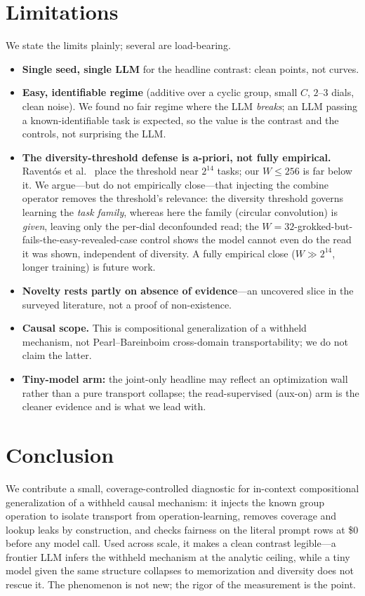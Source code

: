 \documentclass[11pt]{article}
\begin{document}
\section{Limitations}\label{sec:limits}
We state the limits plainly; several are load-bearing.
\begin{itemize}
\item \textbf{Single seed, single LLM} for the headline contrast: clean points, not curves.
\item \textbf{Easy, identifiable regime} (additive over a cyclic group, small $C$, $2$--$3$ dials, clean
noise). We found no fair regime where the LLM \emph{breaks}; an LLM passing a known-identifiable task is
expected, so the value is the contrast and the controls, not surprising the LLM.
\item \textbf{The diversity-threshold defense is a-priori, not fully empirical.} Raventós et
al.~\cite{raventos2023pretraining} place the threshold near $2^{14}$ tasks; our $W\leq 256$ is far below it.
We argue---but do not empirically close---that injecting the combine operator removes the threshold's
relevance: the diversity threshold governs learning the \emph{task family}, whereas here the family
(circular convolution) is \emph{given}, leaving only the per-dial deconfounded read; the
$W{=}32$-grokked-but-fails-the-easy-revealed-case control shows the model cannot even do the read it was
shown, independent of diversity. A fully empirical close ($W\gg 2^{14}$, longer training) is future work.
\item \textbf{Novelty rests partly on absence of evidence}---an uncovered slice in the surveyed literature,
not a proof of non-existence.
\item \textbf{Causal scope.} This is compositional generalization of a withheld mechanism, not
Pearl--Bareinboim cross-domain transportability; we do not claim the latter.
\item \textbf{Tiny-model arm:} the joint-only headline may reflect an optimization wall rather than a pure
transport collapse; the read-supervised (aux-on) arm is the cleaner evidence and is what we lead with.
\end{itemize}

\section{Conclusion}
We contribute a small, coverage-controlled diagnostic for in-context compositional generalization of a withheld
causal mechanism: it injects the known group operation to isolate transport from operation-learning, removes
coverage and lookup leaks by construction, and checks fairness on the literal prompt rows at \$0 before
any model call. Used across scale, it makes a clean contrast legible---a frontier LLM infers the withheld
mechanism at the analytic ceiling, while a tiny model given the same structure collapses to memorization and
diversity does not rescue it. The phenomenon is not new; the rigor of the measurement is the point.
\end{document}
